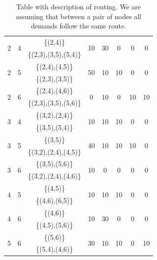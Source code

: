 \begin{table}[h!]
\begin{tabular}{|| c | c | c | c | c | c | c | c ||}
 \multirow{2}{*}{2} & \multirow{2}{*}{4} & \{(2,4)\} & \multirow{2}{*}{10} & \multirow{2}{*}{30} & \multirow{2}{*}{0} & \multirow{2}{*}{0} & \multirow{2}{*}{0}\\
 & & \{(2,3),(3,5),(5,4)\} & & & & &\\ \hline
 \multirow{2}{*}{2} & \multirow{2}{*}{5} & \{(2,4),(4,5)\} & \multirow{2}{*}{50} & \multirow{2}{*}{10} & \multirow{2}{*}{10} & \multirow{2}{*}{0} & \multirow{2}{*}{0}\\
 & & \{(2,3),(3,5)\} & & & & &\\ \hline
 \multirow{2}{*}{2} & \multirow{2}{*}{6} & \{(2,4),(4,6)\} & \multirow{2}{*}{0} & \multirow{2}{*}{10} & \multirow{2}{*}{0} & \multirow{2}{*}{10} & \multirow{2}{*}{10}\\
 & & \{(2,3),(3,5),(5,6)\} & & & & &\\ \hline
 \multirow{2}{*}{3} & \multirow{2}{*}{4} & \{(3,2),(2,4)\} & \multirow{2}{*}{10} & \multirow{2}{*}{10} & \multirow{2}{*}{10} & \multirow{2}{*}{0} & \multirow{2}{*}{0}\\
 & & \{(3,5),(5,4)\} & & & & &\\ \hline
 \multirow{2}{*}{3} & \multirow{2}{*}{5} & \{(3,5)\} & \multirow{2}{*}{40} & \multirow{2}{*}{10} & \multirow{2}{*}{10} & \multirow{2}{*}{10} & \multirow{2}{*}{0}\\
 & & \{(3,2),(2,4),(4,5)\} & & & & &\\ \hline
 \multirow{2}{*}{3} & \multirow{2}{*}{6} & \{(3,5),(5,6)\} & \multirow{2}{*}{10} & \multirow{2}{*}{0} & \multirow{2}{*}{0} & \multirow{2}{*}{0} & \multirow{2}{*}{0}\\
 & & \{(3,2),(2,4),(4,6)\} & & & & &\\ \hline
 \multirow{2}{*}{4} & \multirow{2}{*}{5} & \{(4,5)\} & \multirow{2}{*}{10} & \multirow{2}{*}{10} & \multirow{2}{*}{10} & \multirow{2}{*}{0} & \multirow{2}{*}{0}\\
 & & \{(4,6),(6,5)\} & & & & &\\ \hline
 \multirow{2}{*}{4} & \multirow{2}{*}{6} & \{(4,6)\} & \multirow{2}{*}{10} & \multirow{2}{*}{30} & \multirow{2}{*}{0} & \multirow{2}{*}{0} & \multirow{2}{*}{0}\\
 & & \{(4,5),(5,6)\} & & & & &\\ \hline
 \multirow{2}{*}{5} & \multirow{2}{*}{6} & \{(5,6)\} & \multirow{2}{*}{30} & \multirow{2}{*}{10} & \multirow{2}{*}{10} & \multirow{2}{*}{0} & \multirow{2}{*}{10}\\
 & & \{(5,4),(4,6)\} & & & & &\\
 \hline
\end{tabular}
\caption{Table with description of routing. We are assuming that between a pair of nodes all demands follow the same route.}
\label{path_opaque_protec_ref_medium}
\end{table}

